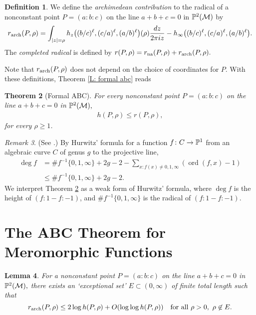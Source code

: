 \documentclass{amsart}
\newcommand\logder{\ell}
\newcommand\ord{\operatorname{ord}}	\newcommand\disc{\operatorname{disc}}
\newcommand\arch{{\textup{arch}}}	\newcommand\na{{\textup{na}}}
\newtheorem{theorem}{Theorem}[section]
\newtheorem{lemma}[theorem]{Lemma}
\theoremstyle{definition}\newtheorem{definition}[theorem]{Definition}
\theoremstyle{remark}\newtheorem{remark}[theorem]{Remark}
\numberwithin{equation}{section}
\begin{document}
\begin{definition}
We define the {\em archimedean contribution\/} to the radical of a nonconstant point $P=(a:b:c)$
on the line $a+b+c=0$ in $\mathbb{P}^2(\mathcal{M})$ by
$$
r_\arch(P,\rho)=\int_{|z|=\rho}h_z\bigl((b/c)^\logder,(c/a)^\logder,(a/b)^\logder\bigr)(\rho)\frac{dz}{2\pi iz}
-h_\infty\bigl((b/c)^\logder,(c/a)^\logder,(a/b)^\logder\bigr).
$$
The {\em completed radical\/} is defined by $r(P,\rho)=r_\na(P,\rho)+r_\arch(P,\rho).$
\end{definition}

Note that $r_\arch(P,\rho)$ does not depend on the choice of coordinates for $P$.
With these definitions,
Theorem \ref{L: formal abc} reads

\begin{theorem}[Formal ABC]\label{T: formal abc}
For every nonconstant point\/ $P=(a:b:c)$ on the line\/ $a+b+c=0$ in\/ $\mathbb{P}^2(\mathcal{M}),$
\begin{gather*}
h(P,\rho)\leq r(P,\rho),
\end{gather*}
for every\/ $\rho\geq1$.
\end{theorem}

\begin{remark}\label{Hurwitz}
(See \cite{abcRM,abcvhi}.)
By Hurwitz' formula for a function $f\colon C\rightarrow\mathbb{P}^1$ from an
algebraic curve $C$ of genus $g$ to the projective line,
\begin{align*}
\deg f&=\#f^{-1}\{0,1,\infty\}+2g-2-\sum_{x\colon f(x)\neq0,1,\infty}(\ord(f,x)-1)\\
&\leq\#f^{-1}\{0,1,\infty\}+2g-2.
\end{align*}
We interpret Theorem \ref{T: formal abc} as a weak form of Hurwitz' formula,
where $\deg f$ is the height of $(f:1-f:-1)$,
and $\#f^{-1}\{0,1,\infty\}$ is the radical of $(f:1-f:-1)$.
\end{remark}

\section{The ABC Theorem for Meromorphic Functions}
\label{S: abc}

\begin{lemma}\label{L: bound}
For a nonconstant point\/ $P=(a:b:c)$ on the line\/ $a+b+c=0$ in $\mathbb{P}^2(\mathcal{M}),$
there exists an `exceptional set'\/ $E\subset(0,\infty)$ of finite total length such that
$$
r_\arch(P,\rho)\leq2\log h(P,\rho)+O(\log\log h(P,\rho))\quad\text{for all }\rho>0,\ \rho\not\in E.
$$
\end{lemma}
\end{document}
